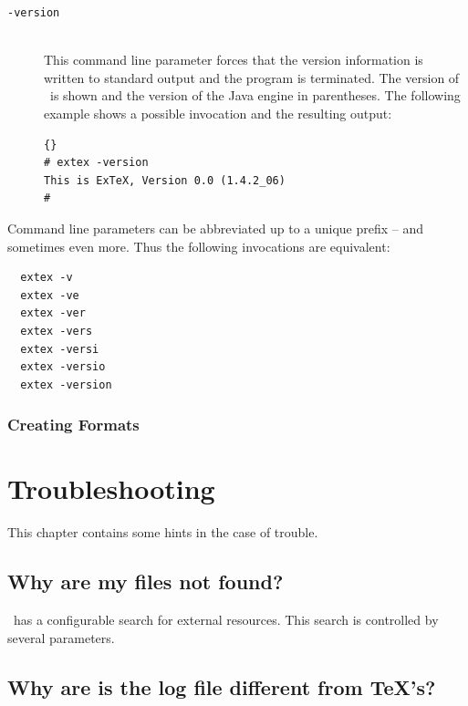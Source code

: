 \documentclass{extex-doc}
\makeatletter
\newcommand\CLI[1]{\texttt{-#1}\index{#1@\texttt{-#1}}}
\makeatother
\begin{document}
\begin{description}
\item[\CLI{version}]\ \\
  This command line parameter forces that the version information is
  written to standard output and the program is
  terminated. The version of \ExTeX\ is shown and the
  version of the Java engine in parentheses. The following
  example shows a possible invocation and the resulting output:

\begin{lstlisting}{}
# extex -version
This is ExTeX, Version 0.0 (1.4.2_06)
#
\end{lstlisting}
\end{description}

Command line parameters can be abbreviated up to a unique prefix --
and sometimes even more. Thus the following invocations are
equivalent:

\begin{verbatim}
  extex -v
  extex -ve
  extex -ver
  extex -vers
  extex -versi
  extex -versio
  extex -version  
\end{verbatim}


\subsection{Creating Formats}

\INCOMPLETE



\chapter{Troubleshooting \ExTeX}

This chapter contains some hints in the case of trouble.

\section{Why are my files not found?}

\ExTeX\ has a configurable search for external resources. This search
is controlled by several parameters.

\INCOMPLETE

\section{Why are is the log file different from \TeX's?}
\end{document}
